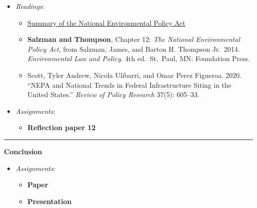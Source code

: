 \begin{itemize}

\item
  \emph{Readings}:

  \begin{itemize}
  
  \item
    \href{https://www.epa.gov/laws-regulations/summary-national-environmental-policy-act}{Summary
    of the National Environmental Policy Act}
  \item
    \textbf{Salzman and Thompson}, Chapter 12: \emph{The National
    Environmental Policy Act}, from Salzman, James, and Barton H.
    Thompson Jr.~2014. \emph{Environmental Law and Policy}. 4th
    ed.~St.~Paul, MN: Foundation Press.
  \item
    Scott, Tyler Andrew, Nicola Ulibarri, and Omar Perez Figueroa. 2020.
    ``NEPA and National Trends in Federal Infrastructure Siting in the
    United States.'' \emph{Review of Policy Research} 37(5): 605--33.
  \end{itemize}
\item
  \emph{Assignments}:

  \begin{itemize}
  
  \item
    \textbf{Reflection paper 12}
  \end{itemize}
\end{itemize}

\begin{center}\rule{0.5\linewidth}{0.5pt}\end{center}

\week \textbf{Conclusion}

\begin{itemize}

\item
  \emph{Assignments}:

  \begin{itemize}
  
  \item
    \textbf{Paper}
  \item
    \textbf{Presentation}
  \end{itemize}
\end{itemize}
